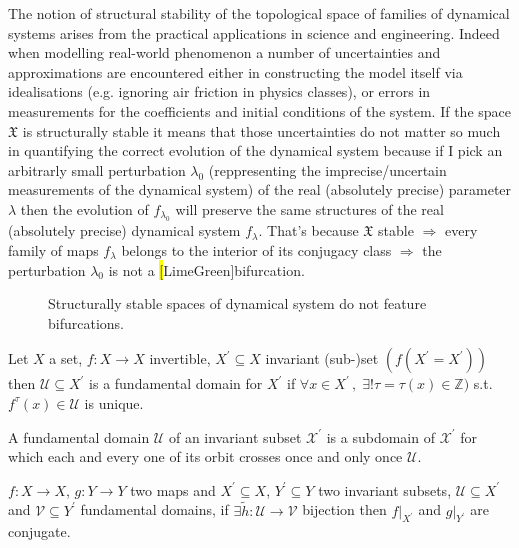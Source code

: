 \documentclass[../main.tex]{subfiles}
\begin{document}
\begin{interpretation*}{}
     The notion of structural stability of the topological space of families of dynamical systems arises from the practical applications in science and engineering. Indeed when modelling real-world phenomenon a number of uncertainties and approximations are encountered either in constructing the model itself via idealisations (e.g. ignoring air friction in physics classes), or errors in measurements for the coefficients and initial conditions of the system.
     If the space $\mathfrak{X}$ is structurally stable it means that those uncertainties do not matter so much in quantifying the correct evolution of the dynamical system because if I pick an arbitrarly small perturbation $\lambda_{0}$ (reppresenting the imprecise/uncertain measurements of the dynamical system) of the real (absolutely precise) parameter $\lambda$ then the evolution of $f_{\lambda_{0}}$ will preserve the same structures of the real (absolutely precise) dynamical system $f_{\lambda}$.
     That's because $\mathfrak{X}$ stable $\Rightarrow$ every family of maps $f_{\lambda}$ belongs to the interior of its conjugacy class $\Rightarrow$ the perturbation $\lambda_{0}$ is not a \hl[LimeGreen]{bifurcation}.
     \begin{figure}[H]
         \centering 
         \caption{Structurally stable spaces of dynamical system do not feature bifurcations.}
         \label{fig4}
     \end{figure}
\end{interpretation*}
\begin{definition}\label{def12}
     Let $X$ a set, $f:X\to X$ invertible, $X^{'}\subseteq X$ invariant (sub-)set $(f(X^{'}=X^{'}))$ then $\mathcal{U}\subseteq X^{'}$ is a fundamental domain for $X^{'}$ if $\forall x \in X^{'}\,,\;\exists ! \tau = \tau(x) \in \mathbb{Z)}$ s.t. $f^{\tau}(x)\in \mathcal{U}$ is unique.
\end{definition}
\begin{interpretation*}{}
     A fundamental domain $\mathcal{U}$ of an invariant subset $\mathcal{X}^{'}$ is a subdomain of $\mathcal{X}^{'}$ for which each and every one of its orbit crosses once and only once $\mathcal{U}$.
\end{interpretation*}
\begin{lemma}
        $f:X\to X$, $g:Y\to Y$ two maps and $X^{'}\subseteq X$, $Y^{'}\subseteq Y$ two invariant subsets, $\mathcal{U}\subseteq X^{'}$ and $\mathcal{V}\subseteq Y^{'}$ fundamental domains, if $\exists \tilde{h}:\mathcal{U}\to \mathcal{V}$ bijection then $f|_{X^{'}}$ and $g|_{Y^{'}}$ are conjugate.
\end{lemma}
\end{document}
